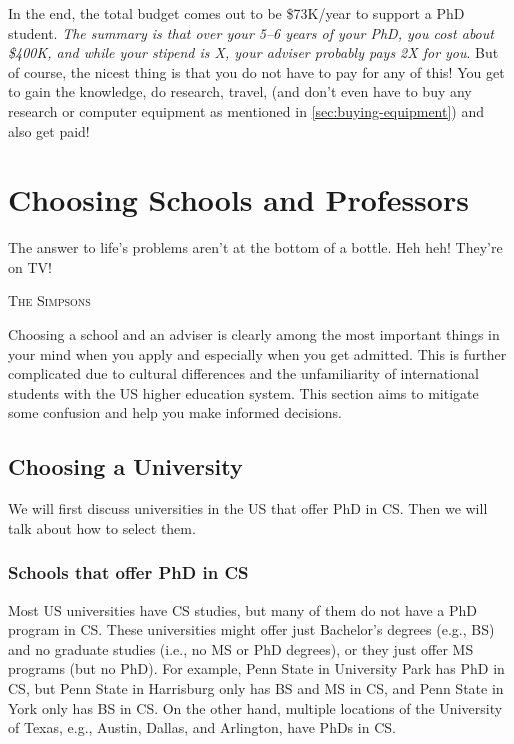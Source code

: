 \documentclass[oneside,11pt,dvipsnames]{book}
\def\chapterinfo#1{%
  \addcontentsline{toc}{chapterinfo}{%
    \noexpand\numberline{}\color{black}{#1}}%
}
\def\sectioninfo#1{%
  \addcontentsline{toc}{sectioninfo}{%
    \noexpand\numberline{}\color{black}{#1}}%
}
\begin{document}
In the end, the total budget comes out to be \$73K/year to support a PhD student. \emph{The summary is that over your 5--6 years of your PhD, you cost about \$400K, and while your stipend is X, your adviser probably pays 2X for you}. But of course, the nicest thing is that you do not have to pay for any of this! You get to gain the knowledge, do research, travel, (and don't even have to buy any research or computer equipment as mentioned in \autoref{sec:buying-equipment}) and also get paid!



\chapter{Choosing Schools and Professors}\label{sec:schoolsandprofs}

\chapterinfo{Not every university has PhD progarms in CS. Not every professor, even those in CS, can advise or graduate CS PhD students.}

\epigraph{\vspace{-0.2in} The answer to life's problems aren't at the bottom of a bottle. Heh heh! They're on TV!}{\textsc{The Simpsons}}


Choosing a school and an adviser is clearly among the most important things in your mind when you apply and especially when you get admitted.  This is further complicated due to cultural differences and the unfamiliarity of international students with the US higher education system.  This section aims to mitigate some confusion and help you make informed decisions.

\section{Choosing a University}\label{sec:choosing-university}
\sectioninfo{Select schools based on their CS program and faculty research interests.}

We will first discuss universities in the US that offer PhD in CS. Then we will talk about how to select them.

\subsection{Schools that offer PhD in CS}

Most US universities have CS studies, but many of them do not have a PhD program in CS. These universities might offer just Bachelor's degrees (e.g., BS) and no graduate studies (i.e., no MS or PhD degrees), or they just offer MS programs (but no PhD). For example, Penn State in University Park has PhD in CS,  but Penn State in Harrisburg only has BS and MS in CS, and Penn State in York only has BS in CS.  On the other hand, multiple locations of the University of Texas, e.g., Austin, Dallas, and Arlington, have PhDs in CS.
\end{document}
